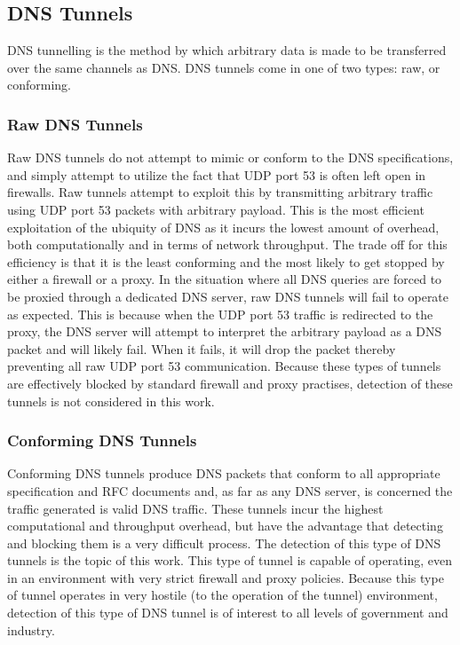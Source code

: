 \documentclass[12pt]{article}
\theoremstyle{remark}
\theoremstyle{definition}
\theoremstyle{definition}
\theoremstyle{definition}
\begin{document}
\subsection{DNS Tunnels}
\label{dnstunnels.types}

DNS tunnelling is the method by which arbitrary data is made to be transferred
over the same channels as DNS. DNS tunnels come in one of two types: raw, or
conforming.

\subsubsection{Raw DNS Tunnels}
\label{dnstunnels.types.raw}
Raw DNS tunnels do not attempt to mimic or conform to the DNS
specifications, and simply attempt to utilize the fact that UDP port 53 is
often left open in firewalls. Raw tunnels attempt to exploit this by
transmitting arbitrary traffic using UDP port 53 packets with arbitrary payload. 
This is the most efficient exploitation of the ubiquity of DNS as it incurs the
lowest amount of overhead, both computationally and in terms of network
throughput. The trade off for this efficiency is that it is the least
conforming and the most likely to get stopped by either a firewall or a proxy.
In the situation where all DNS queries are forced to be proxied through a
dedicated DNS server, raw DNS tunnels will fail to operate as expected. This is
because when the UDP port 53 traffic is redirected to the proxy, the DNS server
will attempt to interpret the arbitrary payload as a DNS packet and will likely
fail. When it fails, it will drop the packet thereby preventing all raw UDP
port 53 communication. Because these types of tunnels are effectively blocked by 
standard firewall and proxy practises, detection of these tunnels is not
considered in this work.

\subsubsection{Conforming DNS Tunnels}
\label{dnstunnels.types.conforming}
Conforming DNS tunnels produce DNS packets that conform to all appropriate
specification and RFC documents and, as far as any DNS server, is concerned the
traffic generated is valid DNS traffic. These tunnels incur the highest
computational and throughput overhead, but have the advantage that detecting
and blocking them is a very difficult process. The detection of this type of
DNS tunnels is the topic of this work. This type of tunnel is capable of
operating, even in an environment with very strict firewall and proxy policies.
Because this type of tunnel operates in very hostile (to the operation of the
tunnel) environment, detection of this type of DNS tunnel is of interest to all
levels of government and industry.
\end{document}
